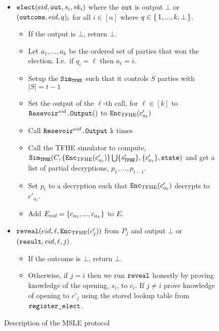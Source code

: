 \begin{figure}
{\begin{minipage}{1\textwidth}
\begin{itemize}

				\item $\texttt{elect}({eid}, \texttt{out}, s_i, sk_i)$ where the $\texttt{out}$ is output $\bot$ or $(\texttt{outcome}, {eid}, q)_i$ for all $i \in [n]$ where $q \in \set{1, ..., k, \bot}$.
				      \begin{itemize}
					      \item If the output is $\bot$, return $\bot$.
					      \item Let $a_1, ..., a_k$ be the ordered set of parties that won the election. I.e.\ if $q_i = \ell$ then $a_\ell = i$.
					      \item Setup the $\texttt{Sim}_{{\texttt{TFHE}}}$ such that it controls $S$ parties with $|S| = t - 1$
					      \item Set the output of the $\ell$-th call, for $\ell \in [k]$ to $\texttt{Resevoir}^{{eid}}\texttt{.Output}()$ to $\texttt{Enc}_{\mathrm{TFHE}}(c'_{a_\ell})$
					      \item Call $\texttt{Resevoir}^{{eid}}\texttt{.Output}$ k times
					      \item Call the TFHE simulator to compute, $\texttt{Sim}_{{\texttt{TFHE}}}(C, \{\texttt{Enc}_{\mathrm{TFHE}}(c'_{a_\ell})\} \bigcup \{s'_{{\texttt{TFHE}}}\}, \{c'_{a_\ell}\}, \texttt{state})$
					            and get a list of partial decryptions, $p_1, ..., p_{t - 1}$.
					      \item Set $p_t$ to a decryption such that $\texttt{Enc}_{\mathrm{TFHE}}(c'_{a_\ell})$ decrypts to $c'_{a_\ell}$.
					      \item Add $E_{eid} = \left\{c_{a_1}, ..., c_{a_k}\right\}$ to $E$.
				      \end{itemize}
				\item $\texttt{reveal}({eid}, \ell, \texttt{Enc}_{\mathrm{TFHE}}(c'_j))$ from $P_j$ and output $\bot$ or $(\texttt{result}, {eid}, \ell, j)$.
				      \begin{itemize}
					      \item If the outcome is $\bot$, return $\bot$.
					      \item Otherwise, if $j = i$ then we run $\texttt{reveal}$ honestly by proving knowledge of the opening, $s_i$, to $c_i$.
					            If $j \neq i$ prove knowledge of opening to $c'_j$ using the stored lookup table from $\texttt{register\_elect}$.
				      \end{itemize}
			\end{itemize}
		\end{minipage}
	}
	\caption{Description of the MSLE protocol}
	\label{fig:protocolMSLE}
\end{figure}



